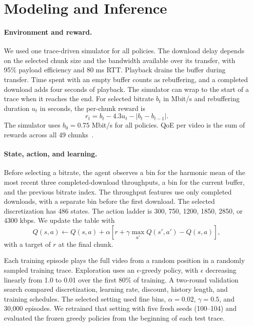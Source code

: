 \documentclass[10pt,letterpaper]{article}
\begin{document}
\section{Modeling and Inference}

\paragraph{Environment and reward.}
We used one trace-driven simulator for all policies. The download delay
depends on the selected chunk size and the bandwidth available over its
transfer, with 95\% payload efficiency and 80 ms RTT. Playback drains the
buffer during transfer. Time spent with an empty buffer counts as
rebuffering, and a completed download adds four seconds of playback. The
simulator can wrap to the start of a trace when it reaches the end. For
selected bitrate \(b_t\) in Mbit/s and rebuffering duration \(u_t\) in seconds,
the per-chunk reward is
\[
r_t=b_t-4.3u_t-\lvert b_t-b_{t-1}\rvert.
\]
The simulator uses \(b_0=0.75\) Mbit/s for all policies. QoE per video is the sum
of rewards across all 49 chunks~\cite{simulator}.

\paragraph{State, action, and learning.}
Before selecting a bitrate, the agent observes a bin for the harmonic mean of
the most recent three completed-download throughputs, a bin for the current
buffer, and the previous bitrate index. The throughput features use only
completed downloads, with a separate bin before the first download. The
selected discretization has 486 states. The action ladder is 300, 750, 1200,
1850, 2850, or 4300 kbps. We update the table with
\[
 Q(s,a)\gets Q(s,a)+\alpha\left[r+\gamma\max_{a'}Q(s',a')-Q(s,a)\right],
\]
with a target of \(r\) at the final chunk.

Each training episode plays the full video from a random position in a
randomly sampled training trace. Exploration uses an \(\epsilon\)-greedy
policy, with \(\epsilon\) decreasing linearly from 1.0 to 0.01 over the first
80\% of training. A two-round validation search compared discretization,
learning rate, discount, history length, and training schedules. The
selected setting used fine bins, \(\alpha=0.02\), \(\gamma=0.5\), and 30,000
episodes. We retrained that setting with five fresh seeds (100--104) and
evaluated the frozen greedy policies from the beginning of each test trace.
\end{document}
